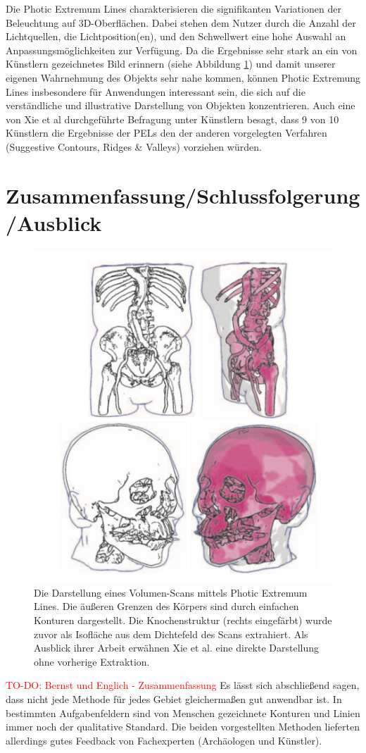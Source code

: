 \documentclass{paperStyle}
\newcommand\todo[1]{\textcolor{red}{#1}}
\begin{document}
Die Photic Extremum Lines charakterisieren die signifikanten Variationen der Beleuchtung auf 3D-Oberflächen. Dabei stehen dem Nutzer durch die Anzahl der Lichtquellen, die Lichtposition(en), und den Schwellwert eine hohe Auswahl an Anpassungsmöglichkeiten zur Verfügung. Da die Ergebnisse sehr stark an ein von Künstlern gezeichnetes Bild erinnern (siehe Abbildung \ref{ausblpel}) und damit unserer eigenen Wahrnehmung des Objekts sehr nahe kommen, können Photic Extremung Lines insbesondere für Anwendungen interessant sein, die sich auf die verständliche und illustrative Darstellung von Objekten konzentrieren. Auch eine von Xie et al \cite{Xie2007} durchgeführte Befragung unter Künstlern besagt, dass 9 von 10 Künstlern die Ergebnisse der PELs den der anderen vorgelegten Verfahren (Suggestive Contours, Ridges \& Valleys) vorziehen würden. 
\section{Zusammenfassung/Schlussfolgerung/Ausblick}


\begin{figure}
	\centering
		\includegraphics[width=0.9\linewidth]{ausblpel.png}
	\caption{Die Darstellung eines Volumen-Scans mittels Photic Extremum Lines. Die äußeren Grenzen des Körpers sind durch einfachen Konturen dargestellt. Die Knochenstruktur (rechts eingefärbt) wurde zuvor als Isofläche aus dem Dichtefeld des Scans extrahiert. Als Ausblick ihrer Arbeit erwähnen Xie et al. eine direkte Darstellung ohne vorherige Extraktion. \cite{Xie2007}}
	\label{ausblpel}
\end{figure}
\todo{TO-DO: Bernst und Englich - Zusammenfassung}
Es lässt sich abschließend sagen, dass nicht jede Methode für jedes Gebiet gleichermaßen gut anwendbar ist. In bestimmten Aufgabenfeldern sind von Menschen gezeichnete Konturen und Linien immer noch der qualitative Standard. Die beiden vorgestellten Methoden lieferten allerdings gutes Feedback von Fachexperten (Archäologen und Künstler).
\end{document}

